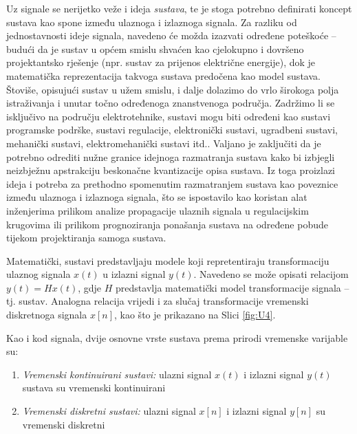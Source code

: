 \documentclass[a4paper,12pt,oneside]{memoir}
\begin{document}
            Uz signale se nerijetko veže i ideja \textit{sustava}, te je stoga potrebno definirati koncept sustava kao spone između ulaznoga i izlaznoga signala. Za razliku od jednostavnosti ideje signala, navedeno će možda izazvati određene poteškoće -- budući da je sustav u općem smislu shvaćen kao cjelokupno i dovršeno projektantsko rješenje (npr. sustav za prijenos električne energije), dok je matematička reprezentacija takvoga sustava predočena kao model sustava. Štoviše, opisujući sustav u užem smislu, i dalje dolazimo do vrlo širokoga polja istraživanja i unutar točno određenoga znanstvenoga područja. Zadržimo li se isključivo na području elektrotehnike, sustavi mogu biti određeni kao sustavi programske podrške, sustavi regulacije, elektronički sustavi, ugradbeni sustavi, mehanički sustavi, elektromehanički sustavi itd.. Valjano je zaključiti da je potrebno odrediti nužne granice idejnoga razmatranja sustava kako bi izbjegli neizbježnu apstrakciju beskonačne kvantizacije opisa sustava. Iz toga proizlazi ideja i potreba za prethodno spomenutim razmatranjem sustava kao poveznice između ulaznoga i izlaznoga signala, što se ispostavilo kao koristan alat inženjerima prilikom analize propagacije ulaznih signala u regulacijskim krugovima ili prilikom prognoziranja ponašanja sustava na određene pobude tijekom projektiranja samoga sustava.

            Matematički, sustavi predstavljaju modele koji repretentiraju transformaciju ulaznog signala $x(t)$ u izlazni signal $y(t)$. Navedeno se može opisati relacijom $y(t)=Hx(t)$, gdje $H$ predstavlja matematički model transformacije signala -- tj. sustav. Analogna relacija vrijedi i za slučaj transformacije vremenski diskretnoga signala $x[n]$, kao što je prikazano na Slici \ref{fig:U4}.
            
            Kao i kod signala, dvije osnovne vrste sustava prema prirodi vremenske varijable su:
            \begin{enumerate}
                \item \textit{Vremenski kontinuirani sustavi:} ulazni signal $x(t)$ i izlazni signal $y(t)$ sustava su vremenski kontinuirani
                \item \textit{Vremenski diskretni sustavi:} ulazni signal $x[n]$ i izlazni signal $y[n]$ su vremenski diskretni
            \end{enumerate}
\end{document}
